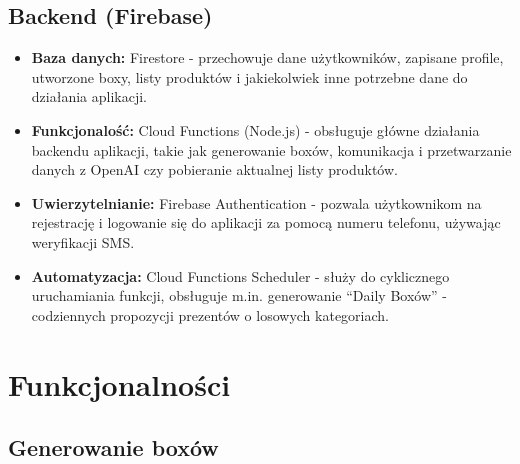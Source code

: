 \documentclass[a4paper, 12pt]{article}
\begin{document}
\subsection{Backend (Firebase)}
\begin{itemize}
    \item \textbf{Baza danych:} Firestore - przechowuje dane użytkowników, zapisane profile, utworzone boxy, listy produktów i jakiekolwiek inne potrzebne dane do działania aplikacji.
    \item \textbf{Funkcjonalość:} Cloud Functions (Node.js) - obsługuje główne działania backendu aplikacji, takie jak generowanie boxów, komunikacja i przetwarzanie danych z OpenAI czy pobieranie aktualnej listy produktów.
    \item \textbf{Uwierzytelnianie:} Firebase Authentication - pozwala użytkownikom na rejestrację i logowanie się do aplikacji za pomocą numeru telefonu, używając weryfikacji SMS.
    \item \textbf{Automatyzacja:} Cloud Functions Scheduler - służy do cyklicznego uruchamiania funkcji, obsługuje m.in. generowanie ``Daily Boxów'' - codziennych propozycji prezentów o losowych kategoriach.
\end{itemize}

\newpage
\section{Funkcjonalności}
\subsection{Generowanie boxów}
\end{document}
